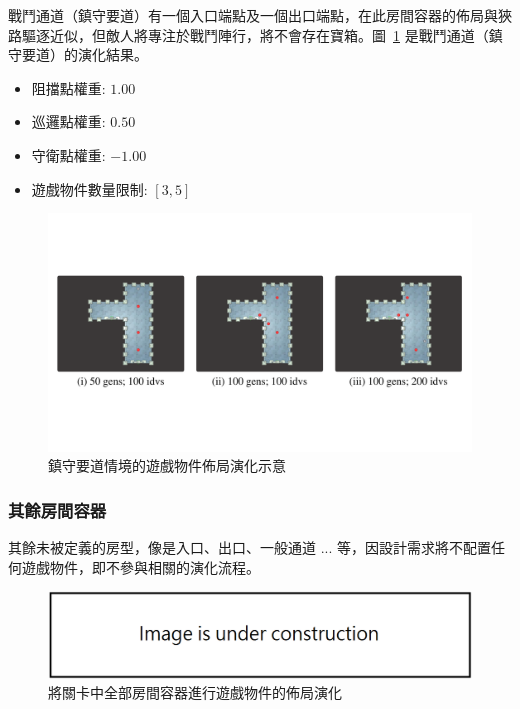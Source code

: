 戰鬥通道（鎮守要道）有一個入口端點及一個出口端點，在此房間容器的佈局與狹路驅逐近似，但敵人將專注於戰鬥陣行，將不會存在寶箱。圖~\ref{fig:applied-ga-on-volume-battlepath-trunk} 是戰鬥通道（鎮守要道）的演化結果。

\begin{itemize}
  \setlength\itemsep{-0.5em}
  \item 阻擋點權重: $1.00$
  \item 巡邏點權重: $0.50$
  \item 守衛點權重: $-1.00$
  \item 遊戲物件數量限制: $[3, 5]$
\end{itemize}

\begin{figure}[H]
  \begin{center}
    \includegraphics[width=1.0\textwidth]{figures/applied-ga-on-volume-battlepath-trunk.pdf}
    \caption{鎮守要道情境的遊戲物件佈局演化示意} 
    \label{fig:applied-ga-on-volume-battlepath-trunk}
  \end{center}
\end{figure}

\subsubsection{其餘房間容器}
\label{sssec:method-segments-appliedonvolumes-others}

其餘未被定義的房型，像是入口、出口、一般通道 ... 等，因設計需求將不配置任何遊戲物件，即不參與相關的演化流程。

\begin{figure}[!htb]
  \begin{center}
    \includegraphics[width=1.0\textwidth]{figures/under_construction.png}
    \caption{將關卡中全部房間容器進行遊戲物件的佈局演化} 
    \label{fig:applied-ga-on-volume-all}
  \end{center}
\end{figure}

